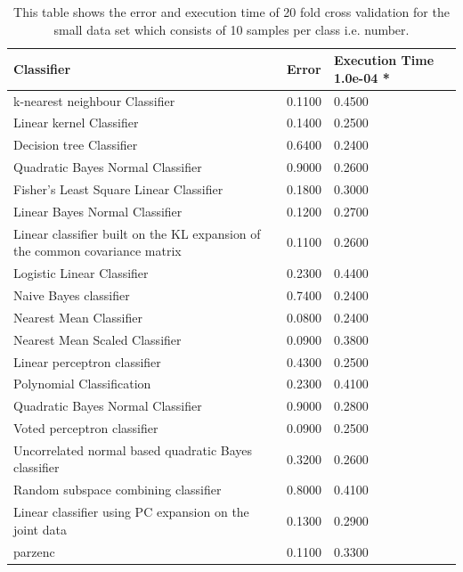 \documentclass[%
        compressed,
        final,
        notitlepage,
        narroweqnarray,
        inline,
        twoside,
        ]{ieee}
\begin{document}
\begin{table}
    \begin{tabular} {p{5cm}lp{1.5cm}} %
        \hline
    Classifier & Error & Execution Time 1.0e-04 * \\
        \hline
    k-nearest neighbour Classifier & 0.1100 & 0.4500 \\
    Linear kernel Classifier & 0.1400 & 0.2500 \\
    Decision tree Classifier & 0.6400 & 0.2400 \\
    Quadratic Bayes Normal Classifier & 0.9000 & 0.2600 \\
    Fisher's Least Square Linear Classifier & 0.1800 & 0.3000 \\
    Linear Bayes Normal Classifier & 0.1200 & 0.2700 \\
    Linear classifier built on the KL expansion of the common covariance matrix & 0.1100 & 0.2600 \\
    Logistic Linear Classifier & 0.2300 & 0.4400 \\
    Naive Bayes classifier & 0.7400 & 0.2400 \\
    Nearest Mean Classifier & 0.0800 & 0.2400 \\
    Nearest Mean Scaled Classifier & 0.0900 & 0.3800 \\
    Linear perceptron classifier & 0.4300 & 0.2500 \\
    Polynomial Classification & 0.2300 & 0.4100 \\
    Quadratic Bayes Normal Classifier & 0.9000 & 0.2800 \\
    Voted perceptron classifier & 0.0900 & 0.2500 \\
    Uncorrelated normal based quadratic Bayes classifier & 0.3200 & 0.2600 \\
    Random subspace combining classifier & 0.8000 & 0.4100 \\
        Linear classifier using PC expansion on the joint data & 0.1300 & 0.2900 \\
    parzenc & 0.1100 & 0.3300 \\
        \hline
    \end{tabular}
    \caption{This table shows the error and execution time of 20 fold cross
    validation for the small data set which consists of 10 samples per class
i.e. number.}
\end{table}
\end{document}
